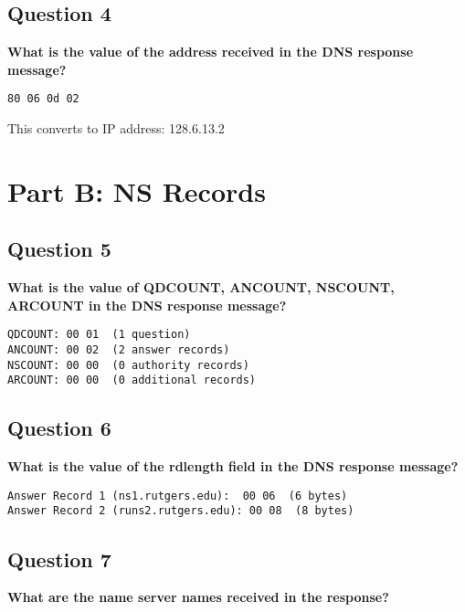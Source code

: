 \documentclass[11pt]{article}
\begin{document}
\vspace{0.5cm}

\subsection*{Question 4}
\textbf{What is the value of the address received in the DNS response message?}

\begin{lstlisting}
80 06 0d 02
\end{lstlisting}

This converts to IP address: 128.6.13.2

\newpage

\section*{Part B: NS Records}

\subsection*{Question 5}
\textbf{What is the value of QDCOUNT, ANCOUNT, NSCOUNT, ARCOUNT in the DNS response message?}

\begin{lstlisting}
QDCOUNT: 00 01  (1 question)
ANCOUNT: 00 02  (2 answer records)
NSCOUNT: 00 00  (0 authority records)
ARCOUNT: 00 00  (0 additional records)
\end{lstlisting}

\vspace{0.5cm}

\subsection*{Question 6}
\textbf{What is the value of the rdlength field in the DNS response message?}

\begin{lstlisting}
Answer Record 1 (ns1.rutgers.edu):  00 06  (6 bytes)
Answer Record 2 (runs2.rutgers.edu): 00 08  (8 bytes)
\end{lstlisting}

\vspace{0.5cm}

\subsection*{Question 7}
\textbf{What are the name server names received in the response?}
\end{document}
